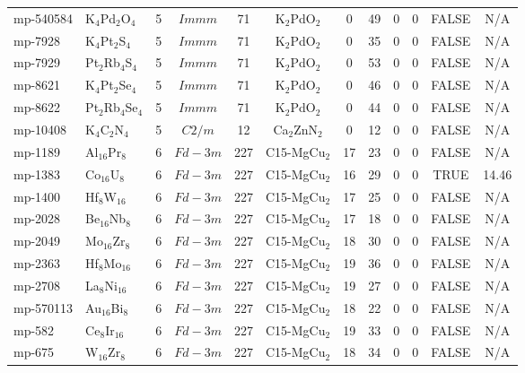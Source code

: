 {\begin{longtable}{llcccccccccc}
    mp-540584 & K$_{4}$Pd$_{2}$O$_{4}$ & 5     & $Immm$ & 71    & K$_{2}$PdO$_{2}$ & 0     & 49    & 0     & 0     & FALSE & N/A \\
    mp-7928 & K$_{4}$Pt$_{2}$S$_{4}$ & 5     & $Immm$ & 71    & K$_{2}$PdO$_{2}$ & 0     & 35    & 0     & 0     & FALSE & N/A \\
    mp-7929 & Pt$_{2}$Rb$_{4}$S$_{4}$ & 5     & $Immm$ & 71    & K$_{2}$PdO$_{2}$ & 0     & 53    & 0     & 0     & FALSE & N/A \\
    mp-8621 & K$_{4}$Pt$_{2}$Se$_{4}$ & 5     & $Immm$ & 71    & K$_{2}$PdO$_{2}$ & 0     & 46    & 0     & 0     & FALSE & N/A \\
    mp-8622 & Pt$_{2}$Rb$_{4}$Se$_{4}$ & 5     & $Immm$ & 71    & K$_{2}$PdO$_{2}$ & 0     & 44    & 0     & 0     & FALSE & N/A \\
    mp-10408 & K$_{4}$C$_{2}$N$_{4}$ & 5     & $C2/m$ & 12    & Ca$_{2}$ZnN$_{2}$ & 0     & 12    & 0     & 0     & FALSE & N/A \\
    mp-1189 & Al$_{16}$Pr$_{8}$ & 6     & $Fd-3m$ & 227   & C15-MgCu$_{2}$ & 17    & 23    & 0     & 0     & FALSE & N/A \\
    mp-1383 & Co$_{16}$U$_{8}$ & 6     & $Fd-3m$ & 227   & C15-MgCu$_{2}$ & 16    & 29    & 0     & 0     & TRUE  & 14.46  \\
    mp-1400 & Hf$_{8}$W$_{16}$ & 6     & $Fd-3m$ & 227   & C15-MgCu$_{2}$ & 17    & 25    & 0     & 0     & FALSE & N/A \\
    mp-2028 & Be$_{16}$Nb$_{8}$ & 6     & $Fd-3m$ & 227   & C15-MgCu$_{2}$ & 17    & 18    & 0     & 0     & FALSE & N/A \\
    mp-2049 & Mo$_{16}$Zr$_{8}$ & 6     & $Fd-3m$ & 227   & C15-MgCu$_{2}$ & 18    & 30    & 0     & 0     & FALSE & N/A \\
    mp-2363 & Hf$_{8}$Mo$_{16}$ & 6     & $Fd-3m$ & 227   & C15-MgCu$_{2}$ & 19    & 36    & 0     & 0     & FALSE & N/A \\
    mp-2708 & La$_{8}$Ni$_{16}$ & 6     & $Fd-3m$ & 227   & C15-MgCu$_{2}$ & 19    & 27    & 0     & 0     & FALSE & N/A \\
    mp-570113 & Au$_{16}$Bi$_{8}$ & 6     & $Fd-3m$ & 227   & C15-MgCu$_{2}$ & 18    & 22    & 0     & 0     & FALSE & N/A \\
    mp-582 & Ce$_{8}$Ir$_{16}$ & 6     & $Fd-3m$ & 227   & C15-MgCu$_{2}$ & 19    & 33    & 0     & 0     & FALSE & N/A \\
    mp-675 & W$_{16}$Zr$_{8}$ & 6     & $Fd-3m$ & 227   & C15-MgCu$_{2}$ & 18    & 34    & 0     & 0     & FALSE & N/A \\

\end{longtable}}
